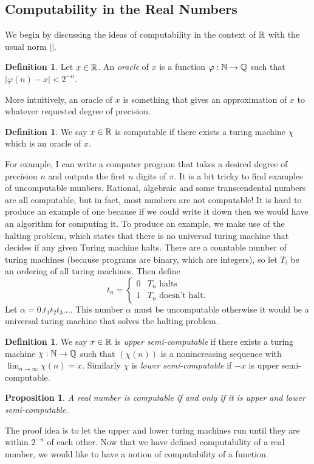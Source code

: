 \documentclass[11pt, reqno]{amsart}
\theoremstyle{plain}
\numberwithin{thm}{subsection}
\newtheorem{prop}[thm]{Proposition}
\theoremstyle{definition}
\newtheorem{defn}[thm]{Definition}
\begin{document}
\subsection{Computability in the Real Numbers}\cite[L6, L7]{wolf}   
We begin by discussing the ideas of computability in the context of $\mathbb{R}$ with the usual norm $||$. 
\begin{defn}
  Let $x \in \mathbb{R}$. An \textit{oracle} of $x$ is a function $\varphi: \mathbb{N} \rightarrow \mathbb{Q}$ such that $|\varphi(n) - x|< 2^{-n}$. 
\end{defn}
More intuitively, an oracle of $x$ is something that gives an approximation of $x$ to whatever requested degree of precision.
\begin{defn}
  We say $x \in \mathbb{R}$ is computable if there exists a turing machine $\chi$ which is an oracle of $x$. 
\end{defn}
For example, I can write a computer program that takes a desired degree of precision $n$ and outputs the first $n$ digits of $\pi$. It is a bit tricky to find examples of uncomputable numbers. Rational, algebraic and some transcendental numbers are all computable, but in fact, most numbers are not computable! It is hard to produce an example of one because if we could write it down then we would have an algorithm for computing it. To produce an example, we make use of the halting problem, which states that there is no universal turing machine that decides if any given Turing machine halts. There are a countable number of turing machines (because programs are binary, which are integers), so let $T_i$ be an ordering of all turing machines. Then define $$t_n = \begin{cases}
  0 & T_n \text{ halts} \\
  1 & T_n \text{ doesn't halt.}
\end{cases}$$ Let $\alpha = 0.t_1t_2t_3\dots$. This number $\alpha$ must be uncomputable otherwise it would be a universal turing machine that solves the halting problem. 

\begin{defn}
  We say $x \in \mathbb{R}$ is \textit{upper semi-computable} if there exists a turing machine $\chi: \mathbb{N} \rightarrow \mathbb{Q}$ such that $(\chi(n))$ is a nonincreasing sequence with $\lim_{n \rightarrow \infty} \chi(n) = x$.
  Similarly $\chi$ is \textit{lower semi-computable} if $-x$ is upper semi-computable.
\end{defn}

\begin{prop}
  A real number is computable if and only if it is upper and lower semi-computable.
\end{prop}
The proof idea is to let the upper and lower turing machines run until they are within $2^{-n}$ of each other. Now that we have defined computability of a real number, we would like to have a notion of computability of a function.
\end{document}
